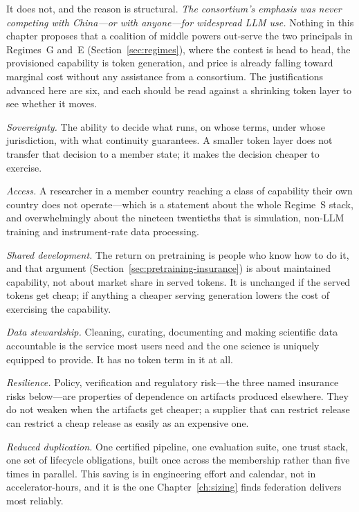 It does not, and the reason is structural. \emph{The consortium's emphasis was never competing with China---or with anyone---for widespread LLM use.} Nothing in this chapter proposes that a coalition of middle powers out-serve the two principals in Regimes~G and~E (Section~\ref{sec:regimes}), where the contest is head to head, the provisioned capability is token generation, and price is already falling toward marginal cost without any assistance from a consortium. The justifications advanced here are six, and each should be read against a shrinking token layer to see whether it moves.

\emph{Sovereignty.} The ability to decide what runs, on whose terms, under whose jurisdiction, with what continuity guarantees. A smaller token layer does not transfer that decision to a member state; it makes the decision cheaper to exercise.

\emph{Access.} A researcher in a member country reaching a class of capability their own country does not operate---which is a statement about the whole Regime~S stack, and overwhelmingly about the nineteen twentieths that is simulation, non-LLM training and instrument-rate data processing.

\emph{Shared development.} The return on pretraining is people who know how to do it, and that argument (Section~\ref{sec:pretraining-insurance}) is about maintained capability, not about market share in served tokens. It is unchanged if the served tokens get cheap; if anything a cheaper serving generation lowers the cost of exercising the capability.

\emph{Data stewardship.} Cleaning, curating, documenting and making scientific data accountable is the service most users need and the one science is uniquely equipped to provide. It has no token term in it at all.

\emph{Resilience.} Policy, verification and regulatory risk---the three named insurance risks below---are properties of dependence on artifacts produced elsewhere. They do not weaken when the artifacts get cheaper; a supplier that can restrict release can restrict a cheap release as easily as an expensive one.

\emph{Reduced duplication.} One certified pipeline, one evaluation suite, one trust stack, one set of lifecycle obligations, built once across the membership rather than five times in parallel. This saving is in engineering effort and calendar, not in accelerator-hours, and it is the one Chapter~\ref{ch:sizing} finds federation delivers most reliably.

